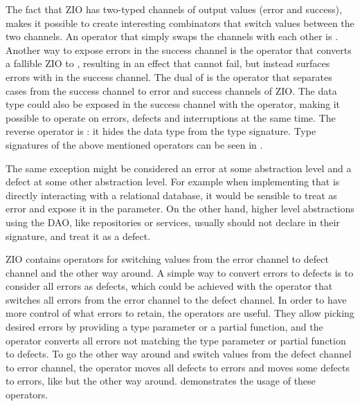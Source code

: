 The fact that ZIO has two-typed channels of output values (error and success), makes it possible to create interesting combinators that switch values between the two channels. An operator that simply swaps the channels with each other is . Another way to expose errors in the success channel is the  operator that converts a fallible ZIO to , resulting in an effect that cannot fail, but instead surfaces errors with  in the success channel. The dual of  is the operator  that separates  cases from the success channel to error and success channels of ZIO. The  data type could also be exposed in the success channel with the  operator, making it possible to operate on errors, defects and interruptions at the same time. The reverse operator is : it hides the  data type from the type signature. Type signatures of the above mentioned operators can be seen in .



The same exception might be considered an error at some abstraction level and a defect at some other abstraction level. For example when implementing  that is directly interacting with a relational database, it would be sensible to treat  as error and expose it in the  parameter. On the other hand, higher level abstractions using the DAO, like repositories or services, usually should not declare  in their signature, and treat it as a defect.

ZIO contains operators for switching values from the error channel to defect channel and the other way around. A simple way to convert errors to defects is to consider all errors as defects, which could be achieved with the  operator that switches all errors from the error channel to the defect channel. In order to have more control of what errors to retain, the  operators are useful. They allow picking desired errors by providing a type parameter or a partial function, and the operator converts all errors not matching the type parameter or partial function to defects. To go the other way around and switch values from the defect channel to error channel, the  operator moves all defects to errors and  moves some defects to errors, like  but the other way around.  demonstrates the usage of these operators.

